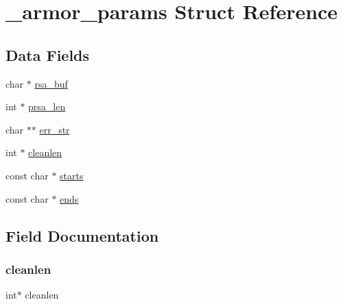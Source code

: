 \hypertarget{struct__armor__params}{}\section{\+\_\+armor\+\_\+params Struct Reference}
\label{struct__armor__params}
\subsection*{Data Fields}
\begin{DoxyCompactItemize}
\item 
char $\ast$ \hyperlink{struct__armor__params_a4d5a117b1ee975cf5f7c41dc95d9b3c3}{rsa\+\_\+buf}
\item 
int $\ast$ \hyperlink{struct__armor__params_aed99b059eefc338a43eafef1ebbd58cb}{prsa\+\_\+len}
\item 
char $\ast$$\ast$ \hyperlink{struct__armor__params_a16c860e01cde9ead304abbb455647dad}{err\+\_\+str}
\item 
int $\ast$ \hyperlink{struct__armor__params_a60bc4e9d6936762c1fe0124309c24238}{cleanlen}
\item 
const char $\ast$ \hyperlink{struct__armor__params_a96b89f2276aab9b917a959e6009caee8}{starts}
\item 
const char $\ast$ \hyperlink{struct__armor__params_a8800281267ebc56d0034002ed89e2bbb}{ends}
\end{DoxyCompactItemize}


\subsection{Field Documentation}
\mbox{\label{struct__armor__params_a60bc4e9d6936762c1fe0124309c24238}} 
\subsubsection{\texorpdfstring{cleanlen}{cleanlen}}
{\footnotesize\ttfamily int$\ast$ cleanlen}

\mbox{\label{struct__armor__params_a8800281267ebc56d0034002ed89e2bbb}} 
